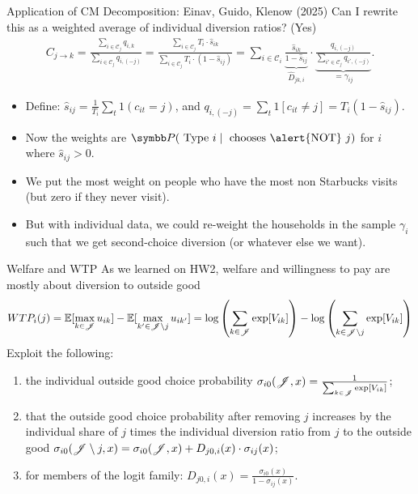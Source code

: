 \documentclass[aspectratio=169,10pt]{beamer}
\begin{document}
\begin{frame}{Application of CM Decomposition: Einav, Guido, Klenow (2025)}
Can I rewrite this as a weighted average of \alert{individual diversion ratios}? (Yes)
\begin{align*}
C_{j \rightarrow k}
=\frac{\sum_{i \in \mathcal{C}_j} q_{i,k}}{\sum_{i \in \mathcal{C}_j} q_{i,(-j)}} 
= \frac{\sum_{i \in \mathcal{C}_j}   T_i \cdot \hat{s}_{ik} }{\sum_{i \in \mathcal{C}_j}  T_i \cdot (1-\hat{s}_{ij}) } 
= \sum_{i \in \mathcal{C}_i} \underbrace{\frac{\hat{s}_{ik}}{1-\hat{s}_{ij}}}_{\hat{D}_{jk,i}} \cdot \underbrace{\frac{q_{i,(-j)}}{\sum_{i' \in \mathcal{C}_j} q_{i',(-j)}}}_{=\gamma_{ij}}.
\end{align*}
\begin{itemize}
    \item Define: $\hat{s}_{ij} = \frac{1}{T_i} \sum_t 1(c_{it} =j)$, and $q_{i,(-j)} = \sum_{t} 1 [c_{it} \neq j] =  T_i (1- \hat{s}_{ij})$. 
    \item Now the weights are $\Pr( \text{ Type } i  \mid \text{ chooses \alert{NOT} } j)$ for $i$ where $\hat{s}_{ij} > 0$.
    \item We put the most weight on people who have the most \alert{non Starbucks} visits\\
    (but zero if they never visit).
    \item But with individual data, we could re-weight the households in the sample $\gamma_i$ such that we get \alert{second-choice diversion} (or whatever else we want).
\end{itemize}
\end{frame}


\begin{frame}{Welfare and WTP}
As we learned on HW2, welfare and willingness to pay are mostly about \alert{diversion to outside good}
\begin{align*}
WTP_i(j) = \mathbb{E}[\max_{k \in \mathscr{J}} u_{ik}]  - \mathbb{E}[\max_{k' \in \mathscr{J}\setminus j} u_{ik'} ] =  \log \left( \sum_{k \in \mathscr{J}} \exp[V_{ik}] \right)-  \log \left(\sum_{k \in \mathscr{J} \setminus j} \exp[V_{ik}]\right)
\end{align*}
Exploit the following:
\begin{enumerate}
 \item the individual outside good choice probability $\sigma_{i0}(\mathscr{J},x) = \frac{1}{ \sum_{k \in \mathscr{J}} \exp[V_{ik}]}$;
 \item  that the outside good choice probability after removing $j$ increases by the individual share of $j$ times the individual diversion ratio from $j$ to the outside good $\sigma_{i0}(\mathscr{J}\setminus j,x)  = \sigma_{i0}(\mathscr{J},x) + D_{j0,i}(x) \cdot \sigma_{ij}(x)$;
 \item for members of the logit family: $D_{j0,i}(x) = \frac{\sigma_{i0}(x)}{1-\sigma_{ij}(x)}$.
\end{enumerate}
\end{frame}
\end{document}
